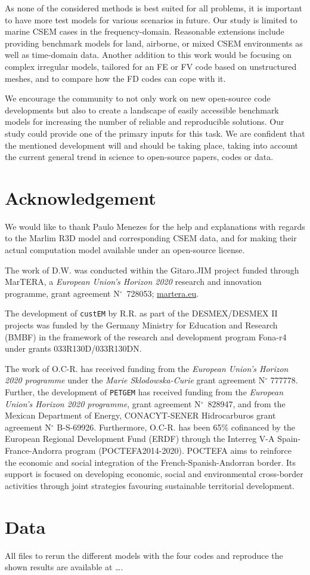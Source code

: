 \documentclass[
    paper,
  ]{geophysics}
\newcommand{\custem}{\texttt{custEM}\xspace}
\newcommand{\petgem}{\texttt{PETGEM}\xspace}
\newcommand{\itodo}[1]{\todo[inline]{\sffamily #1}}
\begin{document}
As none of the considered methods is best suited for all problems, it is important to have more test models for various scenarios in future. Our study is limited to marine CSEM cases in the frequency-domain. Reasonable extensions include providing benchmark models for land, airborne, or mixed CSEM environments as well as time-domain data. Another addition to this work would be focusing on complex irregular  models, tailored for an FE or FV code based on unstructured meshes, and to compare how the FD codes can cope with it.

We encourage the community to not only work on new open-source code developments but also to create a landscape of easily accessible benchmark models for increasing the number of reliable and reproducible solutions. Our study could provide one of the primary inputs for this task. We are confident that the mentioned development will and should be taking place, taking into account the current general trend in science to open-source papers, codes or data.




\section{Acknowledgement}

We would like to thank Paulo Menezes for the help and explanations with regards to the Marlim R3D model and corresponding CSEM data, and for making their actual computation model available under an open-source license.

The work of D.W. was conducted within the Gitaro.JIM project funded through MarTERA, a \emph{European Union's Horizon 2020} research and innovation programme, grant agreement N$^\circ$~728053; \href{https://www.martera.eu}{martera.eu}.

The development of \custem by R.R. as part of the DESMEX/DESMEX II projects was funded by the Germany Ministry for Education and Research (BMBF) in the framework of the research and development program Fona-r4 under grants 033R130D/033R130DN.

The work of O.C-R. has received funding from the \emph{European Union's Horizon 2020 programme} under the \emph{Marie Sklodowska-Curie} grant agreement N$^\circ$ 777778. Further, the development of \petgem has received funding from the \emph{European Union's Horizon 2020 programme}, grant agreement N$^\circ$~828947, and from the Mexican Department of Energy, CONACYT-SENER Hidrocarburos grant agreement N$^\circ$ B-S-69926. Furthermore, O.C-R. has been 65\% cofinanced by the European Regional Development Fund (ERDF) through the Interreg V-A Spain-France-Andorra program (POCTEFA2014-2020). POCTEFA aims to reinforce the economic and social integration of the French-Spanish-Andorran border. Its support is focused on developing economic, social and environmental cross-border activities through joint strategies favouring sustainable territorial development.


\section{Data}

All files to rerun the different models with the four codes and reproduce the shown results are available at \dots.
\itodo{Put up on Zenodo, link here.}



\end{document}
